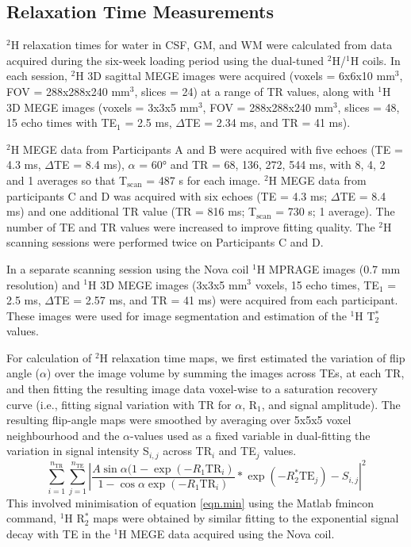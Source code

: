 \documentclass[class=article, crop=false]{standalone}
\begin{document}
\subsection{Relaxation Time Measurements}
\label{Chap:D2O:Relaxation}

$^2$H relaxation times for water in CSF, GM, and WM were calculated from data acquired during the six-week loading period using the dual-tuned $^2$H/$^1$H coils. In each session, $^2$H 3D sagittal MEGE images were acquired (voxels = 6x6x10 mm$^3$, FOV = 288x288x240 mm$^3$, slices = 24) at a range of TR values, along with $^1$H 3D MEGE images (voxels = 3x3x5 mm$^3$, FOV = 288x288x240 mm$^3$, slices = 48, 15 echo times with TE$_1$ = 2.5 ms, $\Delta$TE = 2.34 ms, and TR = 41 ms). 

$^2$H MEGE data from Participants A and B were acquired with five echoes (TE = 4.3 ms, $\Delta$TE = 8.4 ms), $\alpha$ = 60° and TR = 68, 136, 272, 544 ms, with 8, 4, 2 and 1 averages so that T$_\text{scan}$ = 487 s for each image. $^2$H MEGE data from participants C and D was acquired with six echoes (TE = 4.3 ms; $\Delta$TE = 8.4 ms) and one additional TR value (TR = 816 ms; T$_\text{scan}$ = 730 s; 1 average). 
The number of TE and TR values were increased to improve fitting quality. The $^2$H scanning sessions were performed twice on Participants C and D.

In a separate scanning session using the Nova coil $^1$H  MPRAGE images (0.7 mm resolution) and $^1$H 3D MEGE images (3x3x5 mm$^3$ voxels, 15 echo times, TE$_1$ = 2.5 ms, $\Delta$TE = 2.57 ms, and TR = 41 ms) were acquired from each participant. These images were used for image segmentation and estimation of the $^1$H T$_2^*$ values. 

For calculation of $^2$H relaxation time maps, we first estimated the variation of flip angle ($\alpha$) over the image volume by summing the images across TEs, at each TR, and then fitting the resulting image data voxel-wise to a saturation recovery curve (i.e., fitting signal variation with TR for $\alpha$, R$_1$, and signal amplitude). The resulting flip-angle maps were smoothed by averaging over 5x5x5 voxel neighbourhood and the $\alpha$-values used as a fixed variable in dual-fitting the variation in signal intensity S$_{i,j}$ across TR$_i$ and TE$_j$  values. 
\begin{equation}
     \sum_{i=1}^{n_{\text{TR}}}\sum_{j=1}^{n_{\text{TE}}}\left|\frac{A\sin{\alpha}(1-\exp(-R_1 \text{TR}_i)}{1-\cos{\alpha}\exp(-R_1 \text{TR}_i)}*\exp(-R_2^*\text{TE}_j) - S_{i,j}\right|^2
     \label{eqn.min}
\end{equation}
This involved minimisation of equation \ref{eqn.min} using the Matlab fmincon command, $^1$H R$_2^*$ maps were obtained by similar fitting to the exponential signal decay with TE in the $^1$H MEGE data acquired using the Nova coil.
\end{document}
